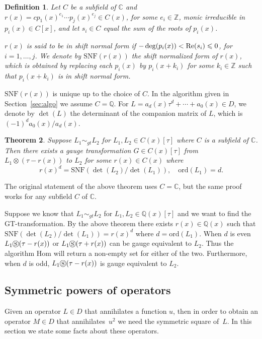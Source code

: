 \documentclass{article}
\newtheorem{theorem}{Theorem}[section]
\newtheorem{definition}[theorem]{Definition}
\newcommand{\Z}{{\mathbb{Z}}} \newcommand{\Q}{{\mathbb{Q}}}
\newcommand{\C}{{\mathbb{C}}} \newcommand{\N}{{\mathbb{N}}}
\newcommand{\ord}{\mathrm{ord}}
\newcommand{\cS}{\circledS}
\newcommand{\SNF}{\mathrm{SNF}}
\begin{document}
\begin{definition}\label{SNFdef}
  Let  $C$ be a subfield of $\C$ and $r(x) = cp_1(x)^{e_1} \dotsm p_j(x)^{e_j} \in C(x)$, for some $e_i \in \Z$,
  monic irreducible in $p_i(x) \in C[x]$, and let $s_i \in C$ equal
  the sum of the roots of $p_i(x)$.

  $r(x)$ is said to be in {\em shift normal form} if $-\deg(p_i(x)) < {\rm Re}(s_i)
  \leqslant 0$, for $i=1, \dotsc, j$. We denote by $\SNF(r(x))$ the shift normalized form
  of $r(x)$, which is obtained by replacing each $p_i(x)$ by $p_i(x+k_i)$ for some $k_i
  \in \Z$ such that $p_i(x+k_i)$ is in shift normal form.
\end{definition}

$\SNF(r(x))$ is unique up to the choice of $C$. In the algorithm given in
Section~\ref{sec:algo} we assume $C=\Q$.  For $L = a_d(x)\tau^d+ \cdots + a_0(x) \in D $,
we denote by $\det(L)$ the determinant of the companion matrix of $L$, which is
$(-1)^da_0(x)/a_d(x)$.

\begin{theorem}\cite[Theorem 2.3.9]{YC11}\label{tpsuff}
  Suppose $L_1 \sim_{gt} L_2$ for $L_1, L_2 \in C(x)[\tau]$ where $C$ is a subfield of
  $\C$.  Then there exists a gauge transformation $G \in C(x)[\tau]$ from $L_1 \otimes
  (\tau-r(x))$ to $L_2$ for some $r(x) \in C(x)$ where $$r(x)^d =
  \SNF(\det(L_2)/\det(L_1)), \quad \ord(L_1)=d.$$
\end{theorem}

The original statement of the above theorem uses $C=\C$, but the same proof works for any
subfield $C$ of $\C$.

Suppose we know that $L_1 \sim_{gt} L_2$ for $L_1, L_2 \in \Q(x)[\tau]$ and we want to
find the GT-transformation.  By the above theorem there exists $r(x) \in \Q(x)$ such that
$\SNF(\det(L_2)/\det(L_1))=r(x)^d$ where $d=\ord(L_1)$.  When $d$ is even $L_1 \cS
(\tau-r(x))$ or $L_1 \cS (\tau+r(x))$ can be gauge equivalent to $L_2$.  Thus the
algorithm Hom will return a non-empty set for either of the two. Furthermore, when $d$ is
odd, $L_1 \cS (\tau-r(x))$ is gauge equivalent to $L_2$.





\subsection{Symmetric powers of operators}
Given an operator $L\in D$ that annihilates a function $u$, then in order to obtain an
operator $M\in D$ that annihilates~$u^2$ we need the symmetric square of~$L$. In this
section we state some facts about these operators.
\end{document}
